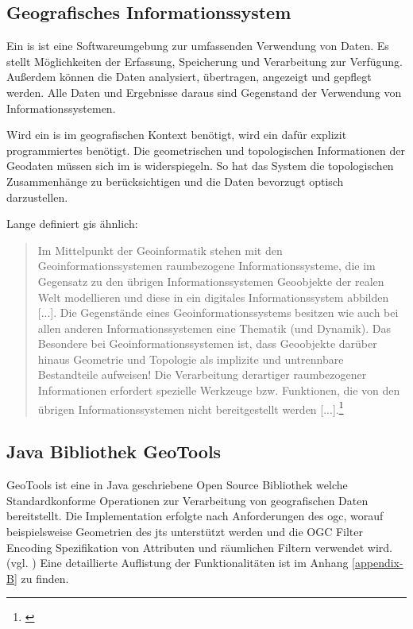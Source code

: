 \subsection{Geografisches Informationssystem}
\label{grundlagen:gis}

Ein \Gls{is} ist eine Softwareumgebung zur umfassenden Verwendung von Daten.
Es stellt Möglichkeiten der Erfassung, Speicherung und Verarbeitung zur Verfügung.
Außerdem können die Daten analysiert, übertragen, angezeigt und gepflegt werden.
Alle Daten und Ergebnisse daraus sind Gegenstand der Verwendung von Informationssystemen.

Wird ein \Gls{is} im geografischen Kontext benötigt, wird ein dafür explizit programmiertes benötigt.
Die geometrischen und topologischen Informationen der Geodaten müssen sich im \Gls{is} widerspiegeln.
So hat das System die topologischen Zusammenhänge zu berücksichtigen und die Daten bevorzugt optisch  darzustellen.

Lange definiert \Gls{gis} ähnlich:
\begin{quote}
Im Mittelpunkt  der  Geoinformatik  stehen  mit den  Geoinformationssystemen raumbezogene Informationssysteme, die im Gegensatz zu den übrigen Informationssystemen Geoobjekte  der realen Welt modellieren und diese in ein digitales Informationssystem abbilden [...]. Die Gegenstände eines Geoinformationssystems  besitzen  wie  auch  bei  allen  anderen  Informationssystemen  eine 
Thematik (und Dynamik). Das Besondere bei Geoinformationssystemen ist, dass Geoobjekte darüber hinaus Geometrie und Topologie als implizite und untrennbare Bestandteile aufweisen!  Die Verarbeitung derartiger raumbezogener Informationen erfordert spezielle Werkzeuge bzw. Funktionen, die von den übrigen Informationssystemen nicht bereitgestellt werden [...].\footnote{\cite[S.337]{book:gi-theopluspraxis3}}
\end{quote}


\subsection{Java Bibliothek GeoTools}
\label{geotools}
GeoTools ist eine in Java geschriebene Open Source Bibliothek welche Standardkonforme Operationen zur Verarbeitung von geografischen Daten bereitstellt.
Die Implementation erfolgte nach Anforderungen des \Gls{ogc}, worauf beispielsweise Geometrien des \Gls{jts} unterstützt werden und die OGC Filter Encoding Spezifikation von Attributen und räumlichen Filtern verwendet wird.(vgl. \cite{website:geotools})
Eine detaillierte Auflistung der Funktionalitäten ist im Anhang \ref{appendix-B} zu finden.

